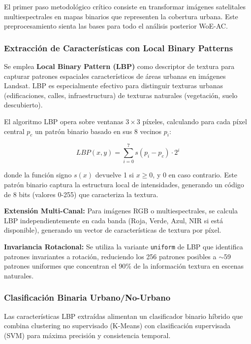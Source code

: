 El primer paso metodológico crítico consiste en transformar imágenes satelitales multiespectrales en mapas binarios que representen la cobertura urbana. Este preprocesamiento sienta las bases para todo el análisis posterior WoE-AC.

\subsubsection{Extracción de Características con Local Binary Patterns}

Se emplea \textbf{Local Binary Pattern (LBP)} \parencite{Ojala2002} como descriptor de textura para capturar patrones espaciales característicos de áreas urbanas en imágenes Landsat. LBP es especialmente efectivo para distinguir texturas urbanas (edificaciones, calles, infraestructura) de texturas naturales (vegetación, suelo descubierto).

El algoritmo LBP opera sobre ventanas $3 \times 3$ píxeles, calculando para cada píxel central $p_c$ un patrón binario basado en sus 8 vecinos $p_i$:

\begin{equation}
LBP(x, y) = \sum_{i=0}^{7} s(p_i - p_c) \cdot 2^i
\label{eq:lbp_formula}
\end{equation}

donde la función signo $s(x)$ devuelve 1 si $x \geq 0$, y 0 en caso contrario. Este patrón binario captura la estructura local de intensidades, generando un código de 8 bits (valores 0-255) que caracteriza la textura.


\textbf{Extensión Multi-Canal:} Para imágenes RGB o multiespectrales, se calcula LBP independientemente en cada banda (Roja, Verde, Azul, NIR si está disponible), generando un vector de características de textura por píxel.


\textbf{Invariancia Rotacional:} Se utiliza la variante \texttt{uniform} de LBP que identifica patrones invariantes a rotación, reduciendo los 256 patrones posibles a $\sim$59 patrones uniformes que concentran el 90\% de la información textura en escenas naturales.

\subsubsection{Clasificación Binaria Urbano/No-Urbano}

Las características LBP extraídas alimentan un clasificador binario híbrido que combina clustering no supervisado (K-Means) con clasificación supervisada (SVM) para máxima precisión y consistencia temporal.



